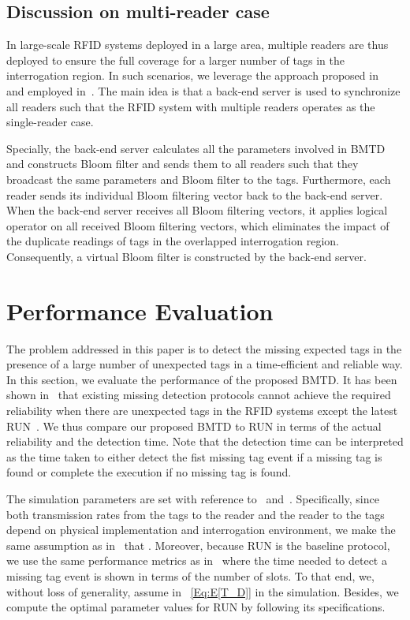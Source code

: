 \documentclass[10pt, twocolumn]{IEEEtran}
\begin{document}
\subsection{Discussion on multi-reader case}


In large-scale RFID systems deployed in a large area, multiple readers are thus deployed to ensure the full coverage for a larger number of tags in the interrogation region. In such scenarios, we leverage the approach proposed in~\cite{kodialam2007anonymous} and employed in~\cite{shahzad2015expecting}.
The main idea is that a back-end server is used to synchronize all readers such that the RFID system with multiple readers operates as the single-reader case.

Specially, the back-end server calculates all the parameters involved in BMTD and constructs Bloom filter and sends them to all readers such that they broadcast the same parameters and Bloom filter to the tags. Furthermore,
each reader sends its individual Bloom filtering vector back to the back-end server. When the back-end server receives all Bloom filtering vectors, it applies logical  operator on all received Bloom filtering vectors, which eliminates the impact of the duplicate readings of tags in the overlapped interrogation region. Consequently, a virtual Bloom filter is constructed by the back-end server.

\section{Performance Evaluation}
\label{sec:simulation}

The problem addressed in this paper is to detect the missing expected tags in the presence of a large number of unexpected tags in a time-efficient and reliable way. In this section, we evaluate the performance of the proposed BMTD. It has been shown in~\cite{shahzad2015expecting} that existing missing detection protocols cannot achieve the required reliability when there are unexpected tags in the RFID systems except the latest RUN~\cite{shahzad2015expecting}. We thus compare our proposed BMTD to RUN in terms of the actual reliability and the detection time. Note that the detection time can be interpreted as the time taken to either detect the fist missing tag event if a missing tag is found or complete the execution if no missing tag is found.

The simulation parameters are set with reference to~\cite{luo2014missing} and~\cite{shahzad2015expecting}. Specifically, since both transmission rates from the tags to the reader and the reader to the tags depend on physical implementation and interrogation environment, we make the same assumption as in~\cite{luo2014missing} that . Moreover, because RUN is the baseline protocol, we use the same performance metrics as in~\cite{shahzad2015expecting} where the time needed to detect a missing tag event is shown in terms of the number of slots. To that end, we, without loss of generality, assume  in ~\eqref{Eq:E[T_D]} in the simulation.
Besides, we compute the optimal parameter values for RUN by following its specifications.
\end{document}
